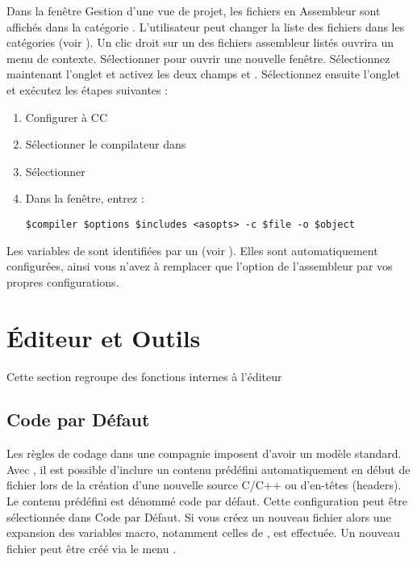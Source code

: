 Dans la fenêtre Gestion d'une vue de projet, les fichiers en Assembleur sont affichés dans la catégorie . L'utilisateur peut changer la liste des fichiers dans les catégories (voir ). Un clic droit sur un des fichiers assembleur listés ouvrira un menu de contexte. Sélectionner  pour ouvrir une nouvelle fenêtre. Sélectionnez maintenant l'onglet  et activez les deux champs   et . Sélectionnez ensuite l'onglet  et exécutez les étapes suivantes :

\begin{enumerate}
\item Configurer  à CC
\item Sélectionner le compilateur dans 
\item Sélectionner 
\item Dans la fenêtre, entrez :
\begin{lstlisting}
$compiler $options $includes <asopts> -c $file -o $object
\end{lstlisting}
\end{enumerate}

Les variables de \codeblocks sont identifiées par un \codeline{$} (voir ). Elles sont automatiquement configurées, ainsi vous n'avez à remplacer que l'option de l'assembleur  par vos propres configurations.


\section{Éditeur et Outils}
\begin{samepage}
Cette section regroupe des fonctions internes à l'éditeur

\subsection{Code par Défaut}
\end{samepage}

Les règles de codage dans une compagnie imposent d'avoir un modèle standard. Avec \codeblocks, il est possible d'inclure un contenu prédéfini automatiquement en début de fichier lors de la création d'une nouvelle source C/C++ ou d'en-têtes (headers). Le contenu prédéfini est dénommé code par défaut. Cette configuration peut être sélectionnée dans   Code par Défaut. Si vous créez un nouveau fichier alors une expansion des variables macro, notamment celles de , est effectuée. Un nouveau fichier peut être créé via le menu .

